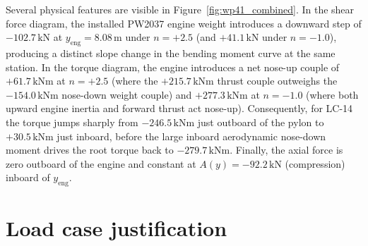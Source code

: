 Several physical features are visible in Figure~\ref{fig:wp41_combined}. In the shear force diagram, the installed PW2037 engine weight introduces a downward step of $-102.7\,\text{kN}$ at $y_{\mathrm{eng}} = 8.08\,\text{m}$ under $n = +2.5$ (and $+41.1\,\text{kN}$ under $n = -1.0$), producing a distinct slope change in the bending moment curve at the same station. In the torque diagram, the engine introduces a net nose-up couple of $+61.7\,\text{kNm}$ at $n = +2.5$ (where the $+215.7\,\text{kNm}$ thrust couple outweighs the $-154.0\,\text{kNm}$ nose-down weight couple) and $+277.3\,\text{kNm}$ at $n = -1.0$ (where both upward engine inertia and forward thrust act nose-up). Consequently, for LC-14 the torque jumps sharply from $-246.5\,\text{kNm}$ just outboard of the pylon to $+30.5\,\text{kNm}$ just inboard, before the large inboard aerodynamic nose-down moment drives the root torque back to $-279.7\,\text{kNm}$. Finally, the axial force is zero outboard of the engine and constant at $A(y) = -92.2\,\text{kN}$ (compression) inboard of $y_{\mathrm{eng}}$.

\section{Load case justification}
\label{sec:load_case_justification}

